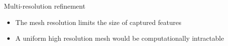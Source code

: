 \begin{frame}{Multi-resolution refinement}
    \begin{itemize}
        \item The mesh resolution limits the size of captured features
        \item A uniform high resolution mesh would be computationally intractable
    \end{itemize}
    \begin{center}%
\end{center}
\end{frame}
